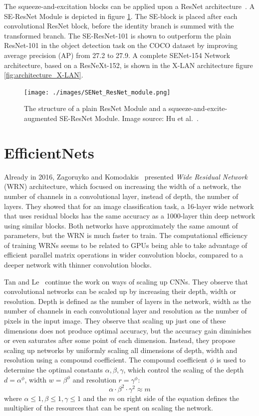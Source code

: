 \documentclass[english,twoside,openright]{HYgraduMLDS}
\begin{document}
The squeeze-and-excitation blocks can be applied upon a ResNet architecture~\cite{SENet}. A SE-ResNet Module is depicted in figure \ref{fig:SENet_module}. The SE-block is placed after each convolutional ResNet block, before the identity branch is summed with the transformed branch. The SE-ResNet-101 is shown to outperform the plain ResNet-101 in the object detection task on the COCO dataset by improving average precision (AP) from 27.2 to 27.9. A complete SENet-154 Network architecture, based on a ResNeXt-152, is shown in the X-LAN architecture figure \ref{fig:architecture_X-LAN}.

\begin{figure}[h] 
\centering
\texttt{[image: ./images/SENet\_ResNet\_module.png]}
\caption{The structure of a plain ResNet Module and a squeeze-and-excite-augmented SE-ResNet Module. Image source: Hu et al.~\cite{SENet}.}
\label{fig:SENet_module} 
\end{figure}

\section{EfficientNets}
\label{section:EfficientNets}
Already in 2016, Zagoruyko and Komodakis~\cite{ZagoruykoK16} presented \textit{Wide Residual Network} (WRN) architecture, which focused on increasing the width of a network, the number of channels in a convolutional layer, instead of depth, the number of layers. They showed that for an image classification task, a 16-layer wide network that uses residual blocks has the same accuracy as a 1000-layer thin deep network using similar blocks. Both networks have approximately the same amount of parameters, but the WRN is much faster to train. The computational efficiency of training WRNs seems to be related to GPUs being able to take advantage of efficient parallel matrix operations in wider convolution blocks, compared to a deeper network with thinner convolution blocks.

Tan and Le~\cite{EfficientNet} continue the work on ways of scaling up CNNs. They observe that convolutional networks can be scaled up by increasing their depth, width or resolution. Depth is defined as the number of layers in the network, width as the number of channels in each convolutional layer and resolution as the number of pixels in the input image. They observe that scaling up just one of these dimensions does not produce optimal accuracy, but the accuracy gain diminishes or even saturates after some point of each dimension. Instead, they propose scaling up networks by uniformly scaling all dimensions of depth, width and resolution using a compound coefficient. The compound coefficient $\phi$ is used to determine the optimal constants $\alpha, \beta, \gamma$, which control the scaling of the depth $d = \alpha^\phi$, width $w = \beta^\phi$ and resolution $r = \gamma^\phi$:
\begin{equation}
\alpha \cdot \beta^2 \cdot \gamma^2 \approx m
\end{equation}
%
where $\alpha \leq 1, \beta \leq 1, \gamma \leq 1$ and the $m$ on right side of the equation defines the multiplier of the resources that can be spent on scaling the network. 
\end{document}
